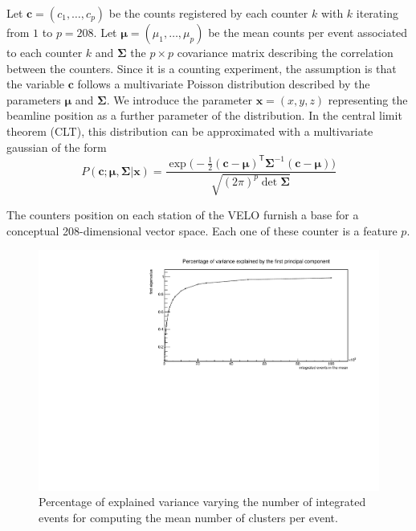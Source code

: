 Let $\mathbf{c}=(c_1, \dots, c_p)$ be the counts registered by each counter $k$ with $k$ iterating from $1$ to $p=208$. Let $\mathbf{\mu}=(\mu_1, \dots, \mu_p)$ be the mean counts per event associated to each counter $k$ and $\mathbf{\Sigma}$ the $p\times p$ covariance matrix describing the correlation between the counters. Since it is a counting experiment, the assumption is that the variable $\mathbf{c}$ follows a multivariate Poisson distribution described by the parameters $\mathbf{\mu}$ and $\mathbf{\Sigma}$. We introduce the parameter $\mathbf{x}=(x,y,z)$ representing the beamline position as a further parameter of the distribution. 
In the central limit theorem (CLT), this distribution can be approximated with a multivariate gaussian of the form 
\begin{equation}
    P(\mathbf{c} ; \mathbf{\mu},\mathbf{\Sigma} |\mathbf{x}) = \frac{\exp \bigl(-\frac{1}{2}(\mathbf{c}-\mathbf{\mu})^{\mathsf{T}}\mathbf{\Sigma}^{-1}(\mathbf{c}-\mathbf{\mu})\bigr)}{\sqrt{(2\pi)^p\det\mathbf{\Sigma}}}
\end{equation} 


The counters position on each station of the VELO furnish a base for a conceptual 208-dimensional vector space. Each one of these counter is a feature $p$. 


\begin{figure}
    \centering
    \includegraphics[width=\textwidth]{figures/explained_variance_new_y.pdf}
    \caption{Percentage of explained variance varying the number of integrated events for computing the mean number of clusters per event.}
    \label{fig:explained_variance}
\end{figure}


